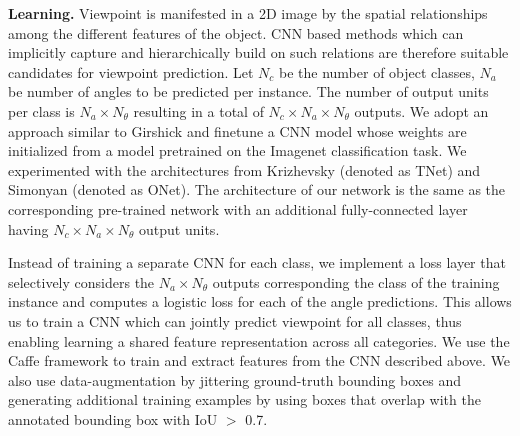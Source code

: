 \vspace{3mm}
\noindent \textbf{Learning.}
Viewpoint is manifested in a 2D image by the spatial relationships among the different features of the object. CNN based methods which can implicitly capture and hierarchically build on such relations are therefore suitable candidates for viewpoint prediction. Let $N_c$ be the number of object classes, $N_a$ be number of angles to be predicted per instance. The number of output units per class is $N_{a} \times N_{\theta}$ resulting in a total of $N_{c} \times N_{a} \times N_{\theta}$ outputs. We adopt an approach similar to Girshick \etal \cite{rcnn} and finetune a CNN model whose weights are initialized from a model pretrained on the Imagenet \cite{imagenet_cvpr09} classification task. We experimented with the architectures from Krizhevsky \etal \cite{Krizhevsky} (denoted as TNet) and Simonyan \etal \cite{Simonyan14c} (denoted as ONet). The architecture of our network is the same as the corresponding pre-trained network with an additional fully-connected layer having $N_{c} \times N_{a} \times N_{\theta}$ output units.

Instead of training a separate CNN for each class, we implement a loss layer that selectively considers the $N_{a} \times N_{\theta}$ outputs corresponding the class of the training instance and computes  a logistic loss for each of the angle predictions. This allows us to train a CNN which can jointly predict viewpoint for all classes, thus enabling learning a shared feature representation across all categories. We use the Caffe framework \cite{jia2014caffe} to train and extract features from the CNN described above. We also use data-augmentation by jittering ground-truth bounding boxes and generating additional training examples by using boxes that overlap with the annotated bounding box with IoU $>$ 0.7.
